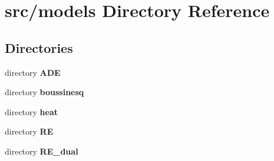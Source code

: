\section{src/models Directory Reference}
\label{dir_bdeba5f06b852fec80257c0bf4c3c36e}
\subsection*{Directories}
\begin{DoxyCompactItemize}
\item 
directory {\bf A\+DE}
\item 
directory {\bf boussinesq}
\item 
directory {\bf heat}
\item 
directory {\bf RE}
\item 
directory {\bf R\+E\+\_\+dual}
\end{DoxyCompactItemize}

